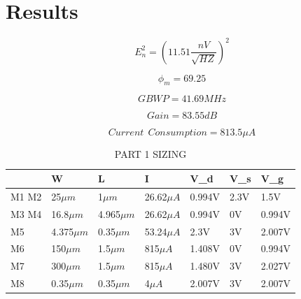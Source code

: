 
\vfill
\section{Results} %
\label{sec:results}


\begin{equation}
  E_n^2=( 11.51 \frac {nV} { \sqrt{HZ}})^2
\end{equation}

\begin{equation}
  \phi_m=69.25
\end{equation}

\begin{equation}
  GBWP=41.69MHz
\end{equation}

\begin{equation}
  Gain=83.55dB
\end{equation}

\begin{equation}
  Current \ \ Consumption = 813.5 \mu A
\end{equation}


\begin{table}[]
\centering
\caption{PART 1 SIZING}
\label{my-label}
\begin{tabular}{|l|l|l|l|l|l|l|}
\hline
      & W      & L      & I      & V\_d   & V\_s & V\_g   \\ \hline
M1 M2 & 25$\mu m$    & 1$\mu m$     & 26.62$\mu A$ & 0.994V & 2.3V & 1.5V   \\ \hline
M3 M4 & 16.8$\mu m$  & 4.965$\mu m$ & 26.62$\mu A$ & 0.994V & 0V   & 0.994V \\ \hline
M5    & 4.375$\mu m$ & 0.35$\mu m$  & 53.24$\mu A$ & 2.3V   & 3V   & 2.007V \\ \hline
M6    & 150$\mu m$   & 1.5$\mu m$   & 815$\mu A$   & 1.408V & 0V   & 0.994V \\ \hline
M7    & 300$\mu m$   & 1.5$\mu m$   & 815$\mu A$   & 1.480V & 3V   & 2.027V \\ \hline
M8    & 0.35$\mu m$  & 0.35$\mu m$  & 4$\mu A$     & 2.007V & 3V   & 2.007V \\ \hline
\end{tabular}
\end{table}



